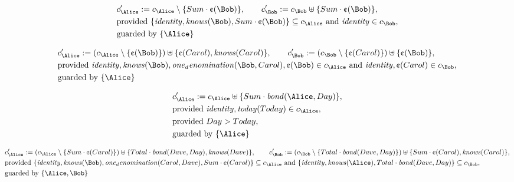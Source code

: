\begin{align*}
&
c'_
{
\Alice
}
 := 
c_
{
\Alice
}
 \setminus 
\{
Sum
\cdot
\text{\textcent}
(
\Bob
)
\}
, \qquad 
c'_
{
\Bob
}
 := 
c_
{
\Bob
}
 \uplus 
\{
Sum
\cdot
\text{\textcent}
(
\Bob
)
\}
,\\
&
\text{provided } 
\{
\mathit{
identity
}
,
\mathit{
knows
}
(
\Bob
)
,
Sum
\cdot
\text{\textcent}
(
\Bob
)
\}
 \subseteq c_
{
\Alice
}
 \text{ and } 
\mathit{
identity
}
 \in c_
{
\Bob
}
,\\
&
\text{guarded by } \{
\Alice
\}
\end{align*}

\begin{align*}
&
c'_
{
\Alice
}
 := 
(c_
{
\Alice
}
 \setminus 
\{
\text{\textcent}
(
\Bob
)
\}
) \uplus 
\{
\text{\textcent}
(
Carol
)
,
\mathit{
knows
}
(
Carol
)
\}
, \qquad 
c'_
{
\Bob
}
 := 
(c_
{
\Bob
}
 \setminus 
\{
\text{\textcent}
(
Carol
)
\}
) \uplus 
\{
\text{\textcent}
(
\Bob
)
\}
,\\
&
\text{provided } 
\mathit{
identity
}
,
\mathit{
knows
}
(
\Bob
)
,
\mathit{
one_denomination
}
(
\Bob
,
Carol
)
,
\text{\textcent}
(
\Bob
)
 \in c_
{
\Alice
}
 \text{ and } 
\mathit{
identity
}
,
\text{\textcent}
(
Carol
)
 \in c_
{
\Bob
}
,\\
&
\text{guarded by } \{
\Alice
\}
\end{align*}

\begin{align*}
&
c'_
{
\Alice
}
 := 
c_
{
\Alice
}
 \uplus 
\{
Sum
\cdot
\mathit{
bond
}
(
\Alice
,
Day
)
\}
,\\
&
\text{provided } 
\mathit{
identity
}
,
\mathit{
today
}
(
Today
)
 \in c_
{
\Alice
}
,\\
&
\text{provided } 
Day
>
Today
,\\
&
\text{guarded by } \{
\Alice
\}
\end{align*}

\begin{align*}
&
c'_
{
\Alice
}
 := 
(c_
{
\Alice
}
 \setminus 
\{
Sum
\cdot
\text{\textcent}
(
Carol
)
\}
) \uplus 
\{
Total
\cdot
\mathit{
bond
}
(
Dave
,
Day
)
,
\mathit{
knows
}
(
Dave
)
\}
, \qquad 
c'_
{
\Bob
}
 := 
(c_
{
\Bob
}
 \setminus 
\{
Total
\cdot
\mathit{
bond
}
(
Dave
,
Day
)
\}
) \uplus 
\{
Sum
\cdot
\text{\textcent}
(
Carol
)
,
\mathit{
knows
}
(
Carol
)
\}
,\\
&
\text{provided } 
\{
\mathit{
identity
}
,
\mathit{
knows
}
(
\Bob
)
,
\mathit{
one_denomination
}
(
Carol
,
Dave
)
,
Sum
\cdot
\text{\textcent}
(
Carol
)
\}
 \subseteq c_
{
\Alice
}
 \text{ and } 
\{
\mathit{
identity
}
,
\mathit{
knows
}
(
\Alice
)
,
Total
\cdot
\mathit{
bond
}
(
Dave
,
Day
)
\}
 \subseteq c_
{
\Bob
}
,\\
&
\text{guarded by } \{
\Alice
,
\Bob
\}
\end{align*}

